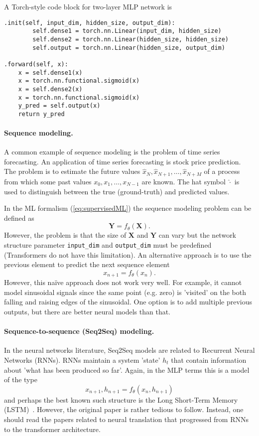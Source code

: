 \documentclass[final]{article}
\begin{document}
A Torch-style code block for two-layer MLP network is 
\begin{lstlisting}
.init(self, input_dim, hidden_size, output_dim):
        self.dense1 = torch.nn.Linear(input_dim, hidden_size)
        self.dense2 = torch.nn.Linear(hidden_size, hidden_size)
        self.output = torch.nn.Linear(hidden_size, output_dim)

.forward(self, x):
    x = self.dense1(x)
    x = torch.nn.functional.sigmoid(x)
    x = self.dense2(x)
    x = torch.nn.functional.sigmoid(x)
    y_pred = self.output(x)
    return y_pred
\end{lstlisting}


\paragraph{Sequence modeling.}
A common example of sequence modeling
is the problem of time series forecasting. An application of time
series forecasting is stock price prediction. 
The problem is to estimate the future values
$\hat{x}_N, \hat{x}_{N+1}, \ldots, \hat{x}_{N+M}$ of a process
from which some past values $x_0, x_{1}, \ldots, x_{N-1}$ are known.
The hat symbol $\hat{\cdot}$ is used to distinguish between the true
(ground-truth) and predicted values.

In the ML formalism (\ref{eq:supervisedML}) the sequence
modeling problem can be defined as
\[
\mathbf{Y} = f_\theta (\mathbf{X}) .
\]
However, the problem is that the size of $\mathbf{X}$ and $\mathbf{Y}$
can vary but the network structure parameter 
\texttt{input\_dim} and \texttt{output\_dim} must be predefined
(Transformers do not have this limitation). An alternative approach is
to use the previous element to predict the next sequence element
\[
x_{n+1} = f_\theta (x_{n}) .
\]
However, this naïve approach does not work very well. For example, it
cannot model sinusoidal signals since the same point (e.g. zero) is
'visited' on the both falling and raising edges of the sinusoidal. One
option is to add multiple previous outputs, but there are better
neural models than that. 

\paragraph{Sequence-to-sequence (Seq2Seq) modeling.}
In the neural networks literature, Seq2Seq models are related to
Recurrent Neural Networks (RNNs). RNNs maintain a system 'state' $h_t$
that contain information about 'what has been produced so far'. Again,
in the MLP terms this is a model of the type
\[
x_{n+1},h_{n+1} = f_\theta (x_{n},h_{n+1})
\]
and perhaps the best known such structure is the Long Short-Term
Memory (LSTM)~\cite{LSTM}. However, the original paper is rather
tedious to follow. Instead, one should read the papers related to
neural translation that progressed from RNNs to the transformer
architecture.
\end{document}
